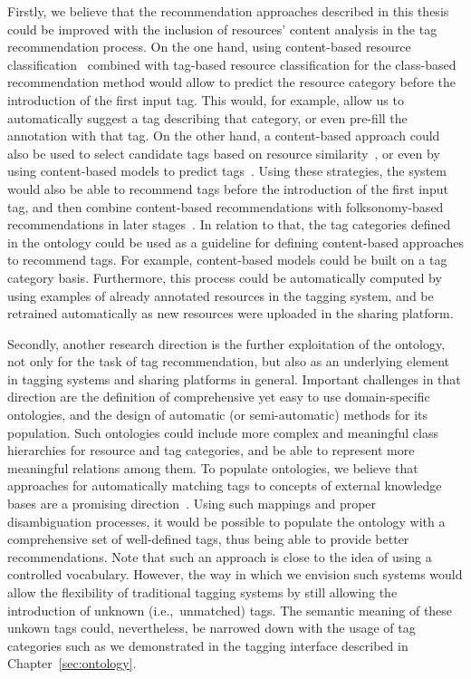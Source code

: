 Firstly, we believe that the recommendation approaches described in this thesis could be improved with the inclusion of resources' content analysis in the tag recommendation process. 
On the one hand, using content-based resource classification~\citep[e.g.,][]{Casey2002,Roma2010} combined with tag-based resource classification for the class-based recommendation method would allow to predict the resource category before the introduction of the first input tag. This would, for example, allow us to automatically suggest a tag describing that category, or even pre-fill the annotation with that tag.
On the other hand, a content-based approach could also be used to select candidate tags based on resource similarity~\citep[e.g.,][]{turnbull2008,Wu2009}, or even by using content-based models to predict tags~\citep[e.g.,][]{martinez2009,ivanov2010}. 
Using these strategies, the system would also be able to recommend tags before the introduction of the first input tag, and then combine content-based recommendations with folksonomy-based recommendations in later stages~\citep[e.g.,][]{Wu2009,Liu2010a}.
In relation to that, the tag categories defined in the ontology could be used as a guideline for defining content-based approaches to recommend tags. 
For example, content-based models could be built on a tag category basis. 
Furthermore, this process could be automatically computed by using examples of already annotated resources in the tagging system, and be retrained automatically as new resources were uploaded in the sharing platform.

Secondly, another research direction is the further exploitation of the ontology, not only for the task of tag recommendation, but also as an underlying element in tagging systems and sharing platforms in general.
Important challenges in that direction are the definition of comprehensive yet easy to use domain-specific ontologies, and the design of automatic (or semi-automatic) methods for its population. 
Such ontologies could include more complex and meaningful class hierarchies for resource and tag categories, and be able to represent more meaningful relations among them.
To populate ontologies, we believe that approaches for automatically matching tags to concepts of external knowledge bases are a promising direction~\citep[e.g.,][]{Specia2007,Angeletou2008,Moro2014}.
Using such mappings and proper disambiguation processes, it would be possible to populate the ontology with a comprehensive set of well-defined tags, thus being able to provide better recommendations. Note that such an approach is close to the idea of using a controlled vocabulary. However, the way in which we envision such systems would allow the flexibility of traditional tagging systems by still allowing the introduction of unknown (i.e.,~unmatched) tags. 
The semantic meaning of these unkown tags could, nevertheless, be narrowed down with the usage of tag categories such as we demonstrated in the tagging interface described in Chapter~\ref{sec:ontology}.


